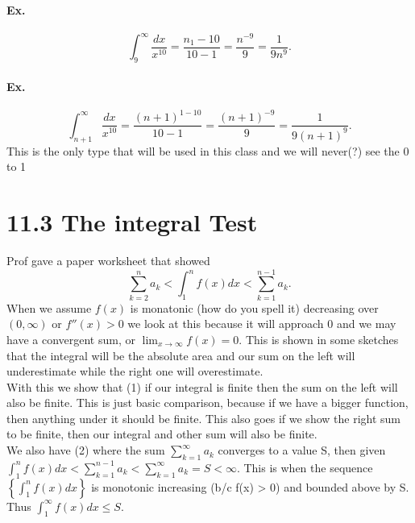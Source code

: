 \paragraph{Ex.}
\[
\int_{ 9 }^{ \infty } \frac{ dx }{ x^{ 10 } } =\frac{ n_1-10 }{ 10-1 }=\frac{ n^{ -9 } }{ 9 } = \frac{ 1 }{ 9n^{ 9 } } 
.\] 

\paragraph{Ex.}
\[
\int_{ n+1 }^{ \infty } \frac{ dx }{ x^{ 10 } } = \frac{ \left( n+1 \right) ^{ 1-10 } }{ 10-1 }=\frac{ \left( n+1 \right) ^{ -9 } }{ 9 }=\frac{ 1 }{ 9\left( n+1 \right) ^{ 9 } } 
.\] 
This is the only type that will be used in this class and we will never(?) see the 0 to 1

\section{11.3 The integral Test}%
\label{sec:11.3 The integral Test}

Prof gave a paper worksheet that showed
\[
\sum_{ k=2 } ^{ n } a_k<\int_{ 1 }^{ n } f\left( x \right) dx<\sum_{ k=1 } ^{ n-1 } a_k
.\] 
When we assume $ f\left( x \right)  $ is monatonic (how do you spell it) decreasing over $ \left( 0,\infty \right)  $ or $ f''\left( x \right) >0 $ we look at this because it will approach 0 and we may have a convergent sum, or $ \lim_{ x \to \infty} f\left( x \right) =0 $. This is shown in some sketches that the integral will be the absolute area and our sum on the left will underestimate while the right one will overestimate. \\

With this we show that (1) if our integral is finite then the sum on the left will also be finite. This is just basic comparison, because if we have a bigger function, then anything under it should be finite. This also goes if we show the right sum to be finite, then our integral and other sum will also be finite. \\

We also have (2) where the sum $ \sum_{ k=1 } ^{ \infty } a_k $ converges to a value S, then given $ \int_{ 1 }^{ n } f\left( x \right) dx <\sum_{ k=1 } ^{ n-1 } a_k<\sum_{ k=1 } ^{ \infty } a_k=S<\infty$. This is when the sequence $ \left\{ \int_{ 1 }^{ n } f\left( x \right) dx \right\}  $ is monotonic increasing (b/c f(x) > 0) and bounded above by S. Thus $ \int_{ 1 }^{ \infty } f\left( x \right) dx\le S $.


